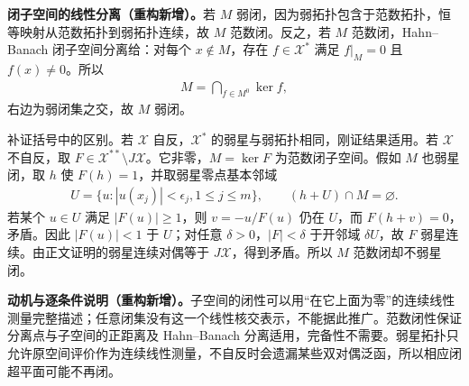 \documentclass[../../main.tex]{subfiles}
\begin{document}
\begin{solution}
\textbf{闭子空间的线性分离（重构新增）。}若 $M$ 弱闭，因为弱拓扑包含于范数拓扑，恒等映射从范数拓扑到弱拓扑连续，故 $M$ 范数闭。反之，若 $M$ 范数闭，Hahn--Banach 闭子空间分离给：对每个 $x\notin M$，存在 $f\in\mathcal X^*$ 满足 $f|_M=0$ 且 $f(x)\ne0$。所以
\begin{align*}
M=\bigcap_{f\in M^0}\ker f,
\end{align*}
右边为弱闭集之交，故 $M$ 弱闭。

补证括号中的区别。若 $\mathcal X$ 自反，$\mathcal X^*$ 的弱星与弱拓扑相同，刚证结果适用。若 $\mathcal X$ 不自反，取 $F\in\mathcal X^{**}\setminus J\mathcal X$。它非零，$M=\ker F$ 为范数闭子空间。假如 $M$ 也弱星闭，取 $h$ 使 $F(h)=1$，并取弱星零点基本邻域
\begin{align*}
U=\{u:|u(x_j)|<\epsilon_j, 1\le j\le m\},\qquad (h+U)\cap M=\varnothing.
\end{align*}
若某个 $u\in U$ 满足 $|F(u)|\ge1$，则 $v=-u/F(u)$ 仍在 $U$，而 $F(h+v)=0$，矛盾。因此 $|F(u)|<1$ 于 $U$；对任意 $\delta>0$，$|F|<\delta$ 于开邻域 $\delta U$，故 $F$ 弱星连续。由正文证明的弱星连续对偶等于 $J\mathcal X$，得到矛盾。所以 $M$ 范数闭却不弱星闭。
\end{solution}
\begin{remark}
\textbf{动机与逐条件说明（重构新增）。}子空间的闭性可以用“在它上面为零”的连续线性测量完整描述；任意闭集没有这一个线性核交表示，不能据此推广。范数闭性保证分离点与子空间的正距离及 Hahn--Banach 分离适用，完备性不需要。弱星拓扑只允许原空间评价作为连续线性测量，不自反时会遗漏某些双对偶泛函，所以相应闭超平面可能不再闭。
\end{remark}
\end{document}
